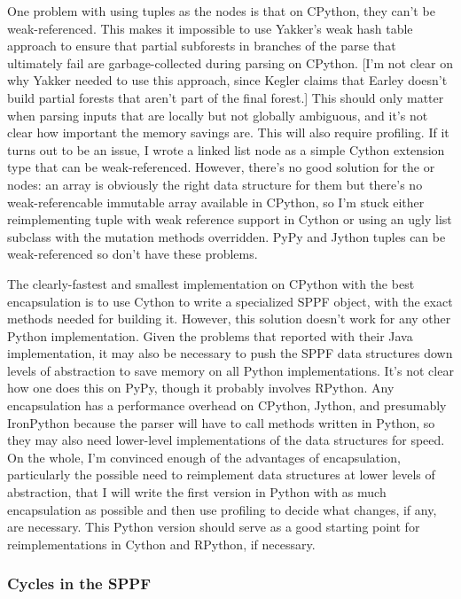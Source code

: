 \documentclass[12pt]{article}
\begin{document}
One problem with using tuples as the nodes is that on CPython, they
can't be weak-referenced.  This makes it impossible to use Yakker's
weak hash table approach to ensure that partial subforests in branches
of the parse that ultimately fail are garbage-collected during parsing
on CPython.  [I'm not clear on why Yakker needed to use this approach,
since Kegler claims that Earley doesn't build partial forests that
aren't part of the final forest.]  This should only matter when
parsing inputs that are locally but not globally ambiguous, and it's
not clear how important the memory savings are.  This will also
require profiling.  If it turns out to be an issue, I wrote a linked
list node as a simple Cython extension type that can be
weak-referenced.  However, there's no good solution for the or nodes:
an array is obviously the right data structure for them but there's no
weak-referencable immutable array available in CPython, so I'm stuck
either reimplementing tuple with weak reference support in Cython or
using an ugly list subclass with the mutation methods overridden.
PyPy and Jython tuples can be weak-referenced so don't have these
problems.

The clearly-fastest and smallest implementation on CPython with the
best encapsulation is to use Cython to write a specialized SPPF
object, with the exact methods needed for building it.  However, this
solution doesn't work for any other Python implementation.  Given the
problems that \textcite{gll3} reported with their Java implementation,
it may also be necessary to push the SPPF data structures down levels
of abstraction to save memory on all Python implementations.  It's not
clear how one does this on PyPy, though it probably involves RPython.
Any encapsulation has a performance overhead on CPython, Jython, and
presumably IronPython because the parser will have to call methods
written in Python, so they may also need lower-level implementations
of the data structures for speed.  On the whole, I'm convinced enough
of the advantages of encapsulation, particularly the possible need to
reimplement data structures at lower levels of abstraction, that I
will write the first version in Python with as much encapsulation as
possible and then use profiling to decide what changes, if any, are
necessary.  This Python version should serve as a good starting point
for reimplementations in Cython and RPython, if necessary.

\subsubsection{Cycles in the SPPF}
\label{sec:sppf_cycles}
\end{document}
